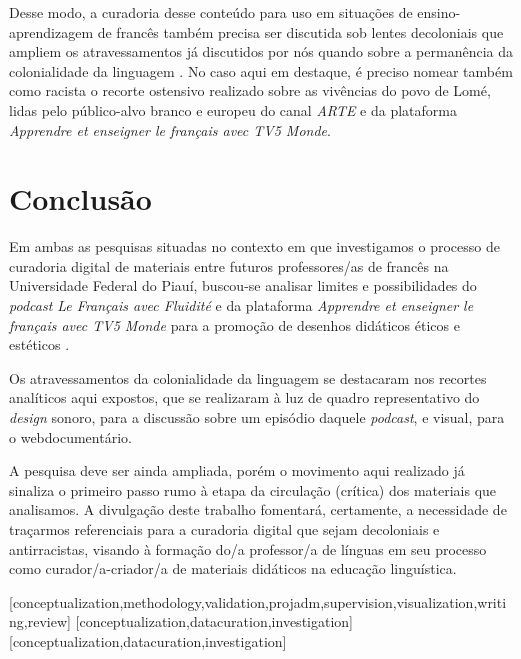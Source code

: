 \documentclass[portuguese]{textolivre}
\begin{document}
Desse modo, a curadoria desse conteúdo para uso em situações de ensino-aprendizagem de francês também precisa ser discutida sob lentes decoloniais que ampliem os atravessamentos já discutidos por nós quando sobre a permanência da colonialidade da linguagem \cite{veronelli_sobre_2021}. No caso aqui em destaque, é preciso nomear também como racista o recorte ostensivo realizado sobre as vivências do povo de Lomé, lidas pelo público-alvo branco e europeu do canal \textit{ARTE} e da plataforma \textit{Apprendre et enseigner le français avec TV5 Monde}.


\section{Conclusão}\label{sec-organizacao-latex}
Em ambas as pesquisas situadas no contexto em que investigamos o processo de curadoria digital de materiais entre futuros professores/as de francês na Universidade Federal do Piauí, buscou-se analisar limites e possibilidades do \textit{podcast Le Français avec Fluidité} e da plataforma \textit{Apprendre et enseigner le français avec TV5 Monde} para a promoção de desenhos didáticos éticos e estéticos \cite{rocha_moocs_2019}. 

Os atravessamentos da colonialidade da linguagem se destacaram nos recortes analíticos aqui expostos, que se realizaram à luz de quadro representativo do \textit{design} sonoro, para a discussão sobre um episódio daquele \textit{podcast}, e visual, para o webdocumentário.  

A pesquisa deve ser ainda ampliada, porém o movimento aqui realizado já sinaliza o primeiro passo rumo à etapa da circulação (crítica) dos materiais que analisamos. A divulgação deste trabalho fomentará, certamente, a necessidade de traçarmos referenciais para a curadoria digital que sejam decoloniais e antirracistas, visando à formação do/a professor/a de línguas em seu processo como curador/a-criador/a de materiais didáticos na educação linguística.

\printbibliography\label{sec-bib}


\begin{contributors}
	[conceptualization,methodology,validation,projadm,supervision,visualization,writing,review]
	[conceptualization,datacuration,investigation]
	[conceptualization,datacuration,investigation]
\end{contributors}
\end{document}
